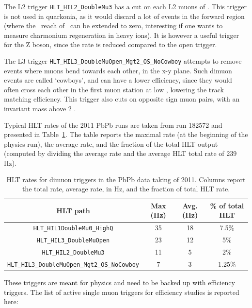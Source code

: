 The L2 trigger \verb?HLT_HIL2_DoubleMu3? has a cut on each L2 muons
of  \GeVc. This trigger is not used in quarkonia, as it would
discard a lot of events in the forward region (where the \pt\ reach of
\Jpsi\ can be extended to zero, interesting if one wants to measure charmonium
regeneration in heavy ions). It is however a useful trigger for the Z
boson, since the rate is reduced compared to the open trigger.

The L3 trigger \verb?HLT_HIL3_DoubleMuOpen_Mgt2_OS_NoCowboy? attempts
to remove events where muons bend towards each other, in the x-y
plane. Such dimuon events are called `cowboys', and can have a lower
efficiency, since they would often cross each other in the first muon
station at low \pt, lowering the track matching efficiency. This
trigger also cuts on opposite sign muon pairs, with an invariant mass
above 2 \unitMass.

Typical HLT rates of the 2011 PbPb runs are taken from run 182572 and
presented in Table~\ref{tab:rates2011}. The table reports the maximal rate
(at the beginning of the physics run), the average rate, and the
fraction of the total HLT output (computed by dividing the average
rate and the average HLT total rate of 239 Hz).

\begin{table}[h]
  \begin{center}
    \begin{tabular}{|c|c|c|c|}
      \hline
      HLT path & Max (Hz) & Avg. (Hz)& \% of total
      HLT\\
      \hline
      \hline
      \verb?HLT_HIL1DoubleMu0_HighQ?& 35 & 18 & 7.5\%\\
      \verb?HLT_HIL3_DoubleMuOpen?  & 23 & 12 & 5\%\\
      \verb?HLT_HIL2_DoubleMu3?     & 11 & 5 & 2\%\\
      \verb?HLT_HIL3_DoubleMuOpen_Mgt2_OS_NoCowboy?& 7 & 3 & 1.25\%\\
      \hline
    \end{tabular}
    \end{center}
  \caption{HLT rates for dimuon triggers in the PbPb data taking of
    2011. Columns report the total rate, average rate, in Hz,
    and the fraction of total HLT rate.}
\label{tab:rates2011}
\end{table}

These triggers are meant for physics and need to be backed up with
efficiency triggers. The list of active single muon triggers for
efficiency studies is reported here:


